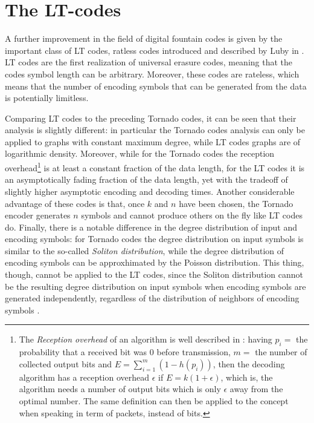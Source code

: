 \section{The LT-codes}
\label{sec:lt}
A further improvement in the field of digital fountain codes is given by the important class of LT codes, ratless codes introduced and described by Luby in \cite{Luby}. LT codes are the first realization of universal erasure codes, meaning that the codes symbol length can be arbitrary. Moreover, these codes are rateless, which means that the number of encoding symbols that can be generated from the data is potentially limitless.

Comparing LT codes to the preceding Tornado codes, it can be seen that their analysis is slightly different: in particular the Tornado codes analysis can only be applied to graphs with constant maximum degree, while LT codes graphs are of logarithmic density. Moreover, while for the Tornado codes the reception overhead\footnote{The \textit{Reception overhead} of an algorithm is well described in \cite{Etesami2006}: having $p_i = $ the probability that a received bit was $0$ before transmission, $m =$ the number of collected output bits and $E = \sum_{i=1}^m(1-h(p_i))$, then the decoding algorithm has a reception overhead $\epsilon$ if $E = k(1+\epsilon)$, which is, the algorithm needs a number of output bits which is only $\epsilon$ away from the optimal number. The same definition can then be applied to the concept when speaking in term of packets, instead of bits.} is at least a constant fraction of the data length, for the LT codes it is an asymptotically fading fraction of the data length, yet with the tradeoff of slightly higher asymptotic encoding and decoding times. Another considerable advantage of these codes is that, once $k$ and $n$ have been chosen, the Tornado encoder generates $n$ symbols and cannot produce others on the fly like LT codes do. Finally, there is a notable difference in the degree distribution of input and encoding symbols: for Tornado codes the degree distribution on input symbols is similar to the so-called \textit{Soliton distribution}, while the degree distribution of encoding symbols can be approxhimated by the Poisson distribution. This thing, though, cannot be applied to the LT codes, since the Soliton distribution cannot be the resulting degree distribution on input symbols when encoding symbols are generated independently, regardless of the distribution of neighbors of encoding symbols \cite{Luby}.

